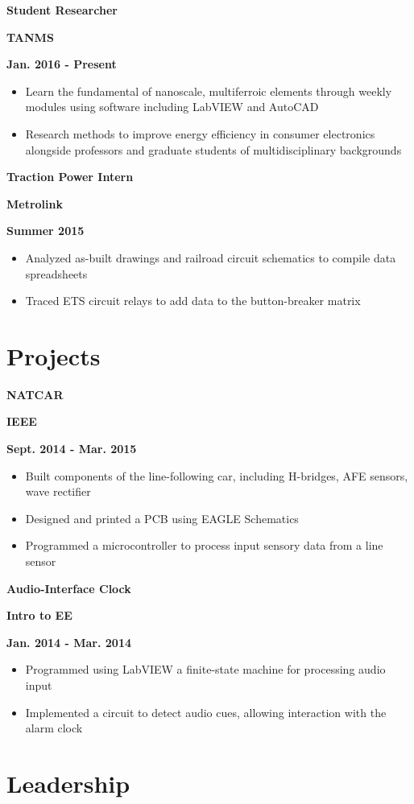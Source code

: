 \documentclass[12pt]{article}
\newcommand\textbox[1]{\parbox{.333\textwidth}{#1}}
\newcommand{\textlcr}[3]{\textbox{\textbf{#1}\hfill}\textbox{\hfil \textbf{#2}\hfil}\textbox{\hfill \textbf{#3}}}
\begin{document}
\bigskip
\textlcr{Student Researcher}{TANMS}{Jan. 2016 - Present}
\begin{itemize}
\item Learn the fundamental of nanoscale, multiferroic elements through weekly modules using software including LabVIEW and AutoCAD
\item Research methods to improve energy efficiency in consumer electronics alongside professors and graduate students of multidisciplinary backgrounds
\end{itemize}

\bigskip
\textlcr{Traction Power Intern}{Metrolink}{Summer 2015}
\begin{itemize}
\item Analyzed as-built drawings and railroad circuit schematics to compile data spreadsheets
\item Traced ETS circuit relays to add data to the button-breaker matrix
\end{itemize}

\section*{Projects}
\vspace*{-1em}\makebox[\linewidth]{\rule{\textwidth}{0.4pt}}

\textlcr{NATCAR}{IEEE}{Sept. 2014 - Mar. 2015}
\begin{itemize}
\item Built components of the line-following car, including H-bridges, AFE sensors, wave rectifier
\item Designed and printed a PCB using EAGLE Schematics
\item Programmed a microcontroller to process input sensory data from a line sensor
\end{itemize}

\bigskip
\textlcr{Audio-Interface Clock}{Intro to EE}{Jan. 2014 - Mar. 2014}
\begin{itemize}
\item Programmed using LabVIEW a finite-state machine for processing audio input
\item Implemented a circuit to detect audio cues, allowing interaction with the alarm clock
\end{itemize}

\section*{Leadership}
\vspace*{-1em}\makebox[\linewidth]{\rule{\textwidth}{0.4pt}}
\end{document}

